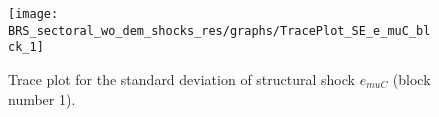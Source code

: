 \begin{figure}[H]
\centering
  \texttt{[image: BRS\_sectoral\_wo\_dem\_shocks\_res/graphs/TracePlot\_SE\_e\_muC\_blck\_1]}\\
    \caption{Trace plot for the standard deviation of structural shock ${e_{muC}}$ (block number 1).}
\end{figure}
